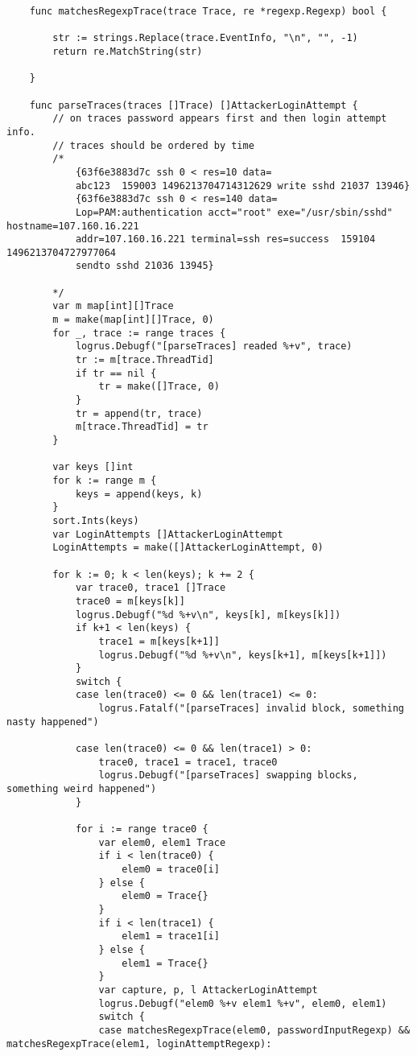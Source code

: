 \begin{verbatim}
    func matchesRegexpTrace(trace Trace, re *regexp.Regexp) bool {
    
        str := strings.Replace(trace.EventInfo, "\n", "", -1)
        return re.MatchString(str)
    
    }
    
    func parseTraces(traces []Trace) []AttackerLoginAttempt {
        // on traces password appears first and then login attempt info.
        // traces should be ordered by time
        /*
            {63f6e3883d7c ssh 0 < res=10 data=
            abc123  159003 1496213704714312629 write sshd 21037 13946}
            {63f6e3883d7c ssh 0 < res=140 data=
            Lop=PAM:authentication acct="root" exe="/usr/sbin/sshd" hostname=107.160.16.221 
            addr=107.160.16.221 terminal=ssh res=success  159104 1496213704727977064 
            sendto sshd 21036 13945}
    
        */
        var m map[int][]Trace
        m = make(map[int][]Trace, 0)
        for _, trace := range traces {
            logrus.Debugf("[parseTraces] readed %+v", trace)
            tr := m[trace.ThreadTid]
            if tr == nil {
                tr = make([]Trace, 0)
            }
            tr = append(tr, trace)
            m[trace.ThreadTid] = tr
        }
    
        var keys []int
        for k := range m {
            keys = append(keys, k)
        }
        sort.Ints(keys)
        var LoginAttempts []AttackerLoginAttempt
        LoginAttempts = make([]AttackerLoginAttempt, 0)
    
        for k := 0; k < len(keys); k += 2 {
            var trace0, trace1 []Trace
            trace0 = m[keys[k]]
            logrus.Debugf("%d %+v\n", keys[k], m[keys[k]])
            if k+1 < len(keys) {
                trace1 = m[keys[k+1]]
                logrus.Debugf("%d %+v\n", keys[k+1], m[keys[k+1]])
            }
            switch {
            case len(trace0) <= 0 && len(trace1) <= 0:
                logrus.Fatalf("[parseTraces] invalid block, something nasty happened")
    
            case len(trace0) <= 0 && len(trace1) > 0:
                trace0, trace1 = trace1, trace0
                logrus.Debugf("[parseTraces] swapping blocks, something weird happened")
            }
    
            for i := range trace0 {
                var elem0, elem1 Trace
                if i < len(trace0) {
                    elem0 = trace0[i]
                } else {
                    elem0 = Trace{}
                }
                if i < len(trace1) {
                    elem1 = trace1[i]
                } else {
                    elem1 = Trace{}
                }
                var capture, p, l AttackerLoginAttempt
                logrus.Debugf("elem0 %+v elem1 %+v", elem0, elem1)
                switch {
                case matchesRegexpTrace(elem0, passwordInputRegexp) && matchesRegexpTrace(elem1, loginAttemptRegexp):
    

\end{verbatim}
